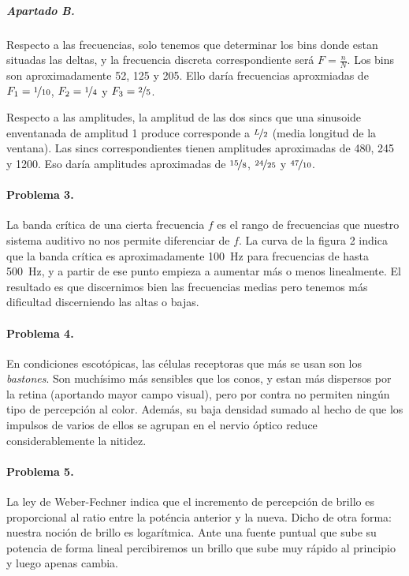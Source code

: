 \subparagraph{Apartado B.}

Respecto a las frecuencias, solo tenemos que determinar los bins donde estan
situadas las deltas, y la frecuencia discreta correspondiente será
$F = \frac{n}{N}$. Los bins son aproximadamente \num{52}, \num{125} y \num{205}.
Ello daría frecuencias aproxmiadas de $F_1 = \nicefrac{1}{10}$, $F_2 = \nicefrac{1}{4}$ y $F_3 = \nicefrac{2}{5}$.

Respecto a las amplitudes, la amplitud de las dos sincs que una sinusoide
enventanada de amplitud 1 produce corresponde a $\nicefrac{L}{2}$ (media
longitud de la ventana). Las sincs correspondientes tienen amplitudes
aproximadas de \num{480}, \num{245} y \num{1200}. Eso daría amplitudes
aproximadas de $\nicefrac{15}{8}$, $\nicefrac{24}{25}$ y $\nicefrac{47}{10}$.

\finishpage


\startpage
\paragraph{Problema 3.}

La banda crítica de una cierta frecuencia $f$ es el rango de frecuencias que nuestro sistema auditivo no nos permite diferenciar de $f$. La curva de la
figura 2 indica que la banda crítica es aproximadamente \SI{100}{\hertz} para
frecuencias de hasta \SI{500}{\hertz}, y a partir de ese punto empieza a
aumentar más o menos linealmente. El resultado es que discernimos bien las
frecuencias medias pero tenemos más dificultad discerniendo las altas o bajas.

\paragraph{Problema 4.}

En condiciones escotópicas, las células receptoras que más se usan son los
\emph{bastones}. Son muchísimo más sensibles que los conos, y estan más
dispersos por la retina (aportando mayor campo visual), pero por contra no
permiten ningún tipo de percepción al color. Además, su baja densidad sumado
al hecho de que los impulsos de varios de ellos se agrupan en el nervio óptico
reduce considerablemente la nitidez.

\paragraph{Problema 5.}

La ley de Weber-Fechner indica que el incremento de percepción de brillo es
proporcional al ratio entre la poténcia anterior y la nueva. Dicho de otra
forma: nuestra noción de brillo es logarítmica. Ante una fuente puntual que sube
su potencia de forma lineal percibiremos un brillo que sube muy rápido al
principio y luego apenas cambia.

